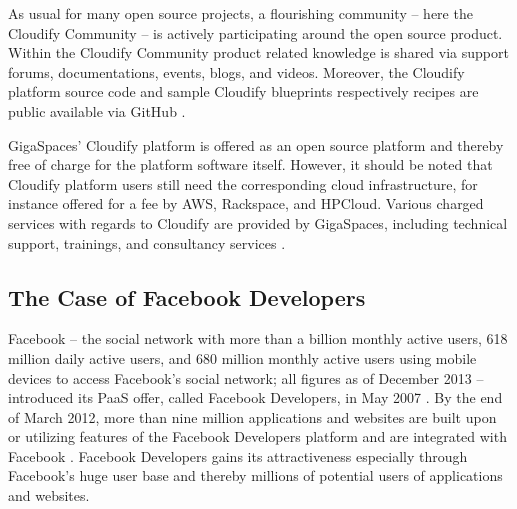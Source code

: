 As usual for many open source projects, a flourishing community -- here the Cloudify Community -- is actively participating around the open source product. Within the Cloudify Community product related knowledge is shared via support forums, documentations, events, blogs, and videos. Moreover, the Cloudify platform source code and sample Cloudify blueprints respectively recipes are public available via GitHub \citep{GigaSpaces2013b,GitHub2013,GitHub2013a}.

GigaSpaces' Cloudify platform is offered as an open source platform and thereby free of charge for the platform software itself. However, it should be noted that Cloudify platform users still need the corresponding cloud infrastructure, for instance offered for a fee by \ac{AWS}, Rackspace, and HPCloud. Various charged services with regards to Cloudify are provided by GigaSpaces, including technical support, trainings, and consultancy services \citep{GigaSpaces2013a}.



\subsection{The Case of Facebook Developers}\label{ch:sota:fd}

Facebook -- the social network with more than a billion monthly active users, 618 million daily active users, and 680 million monthly active users using mobile devices to access Facebook's social network; all figures as of December 2013 -- introduced its \ac{PaaS} offer, called Facebook Developers, in May 2007 \citep{Facebook2013}. By the end of March 2012, more than nine million applications and websites are built upon or utilizing features of the Facebook Developers platform and are integrated with Facebook \citep{Facebook2013}. Facebook Developers gains its attractiveness especially through Facebook's huge user base and thereby millions of potential users of applications and websites.

